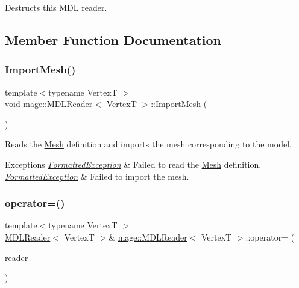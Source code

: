 Destructs this M\+DL reader. 

\subsection{Member Function Documentation}
\hypertarget{classmage_1_1_m_d_l_reader_ab688ce530cab867d155b696b2a1133a0}{}\label{classmage_1_1_m_d_l_reader_ab688ce530cab867d155b696b2a1133a0} 
\subsubsection{\texorpdfstring{Import\+Mesh()}{ImportMesh()}}
{\footnotesize\ttfamily template$<$typename VertexT $>$ \\
void \hyperlink{classmage_1_1_m_d_l_reader}{mage\+::\+M\+D\+L\+Reader}$<$ VertexT $>$\+::Import\+Mesh (\begin{DoxyParamCaption}{ }\end{DoxyParamCaption})\hspace{0.3cm}{\ttfamily [private]}}

Reads the \hyperlink{classmage_1_1_mesh}{Mesh} definition and imports the mesh corresponding to the model.


\begin{DoxyExceptions}{Exceptions}
{\em \hyperlink{classmage_1_1_formatted_exception}{Formatted\+Exception}} & Failed to read the \hyperlink{classmage_1_1_mesh}{Mesh} definition. \\
\hline
{\em \hyperlink{classmage_1_1_formatted_exception}{Formatted\+Exception}} & Failed to import the mesh. \\
\hline
\end{DoxyExceptions}
\hypertarget{classmage_1_1_m_d_l_reader_aa60388b9e76eb2244f356d1d5fde2cb6}{}\label{classmage_1_1_m_d_l_reader_aa60388b9e76eb2244f356d1d5fde2cb6} 
\subsubsection{\texorpdfstring{operator=()}{operator=()}\hspace{0.1cm}{\footnotesize\ttfamily [1/2]}}
{\footnotesize\ttfamily template$<$typename VertexT $>$ \\
\hyperlink{classmage_1_1_m_d_l_reader}{M\+D\+L\+Reader}$<$ VertexT $>$\& \hyperlink{classmage_1_1_m_d_l_reader}{mage\+::\+M\+D\+L\+Reader}$<$ VertexT $>$\+::operator= (\begin{DoxyParamCaption}\item[{const \hyperlink{classmage_1_1_m_d_l_reader}{M\+D\+L\+Reader}$<$ VertexT $>$ \&}]{reader }\end{DoxyParamCaption})\hspace{0.3cm}{\ttfamily [delete]}}


